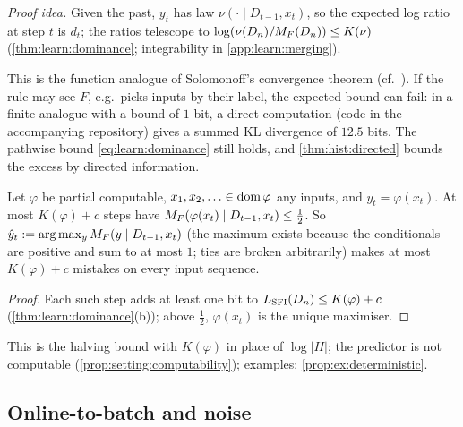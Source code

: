 \emph{Proof idea.} Given the past, $y_t$ has law $\nu(\cdot\mid D_{t-1},x_t)$, so the expected log ratio at step $t$ is $d_t$; the ratios telescope to $\log(\nu(D_n)/M_{F}(D_n))\le K(\nu)$ (\cref{thm:learn:dominance}; integrability in \cref{app:learn:merging}).

This is the function analogue of Solomonoff's convergence theorem (cf.\ \citealp{solomonoff1978complexity}). If the rule may see $F$, e.g.\ picks inputs by their label, the expected bound can fail: in a finite analogue with a bound of $1$ bit, a direct computation (code in the accompanying repository) gives a summed KL divergence of $12.5$ bits. The pathwise bound \eqref{eq:learn:dominance} still holds, and \cref{thm:hist:directed} bounds the excess by directed information.

\begin{corollary}\label{cor:learn:mistakes}
Let $\varphi$ be partial computable, $x_1,x_2,\ldots\in\operatorname{dom}\varphi$ any inputs, and $y_t=\varphi(x_t)$. At most $K(\varphi)+c$ steps have $M_{F}(\varphi(x_t)\mid D_{t-1},x_t)\le\frac12$. So $\hat y_t:=\arg\max_yM_{F}(y\mid D_{t-1},x_t)$ (the maximum exists because the conditionals are positive and sum to at most $1$; ties are broken arbitrarily) makes at most $K(\varphi)+c$ mistakes on every input sequence.
\end{corollary}

\begin{proof}
Each such step adds at least one bit to $L_{\mathrm{SFI}}(D_n)\le K(\varphi)+c$ (\cref{thm:learn:dominance}(b)); above $\frac12$, $\varphi(x_t)$ is the unique maximiser.
\end{proof}

This is the halving bound with $K(\varphi)$ in place of $\log|H|$; the predictor is not computable (\cref{prop:setting:computability}); examples: \cref{prop:ex:deterministic}.

\subsection{Online-to-batch and noise}\label{sec:learn:batch}

